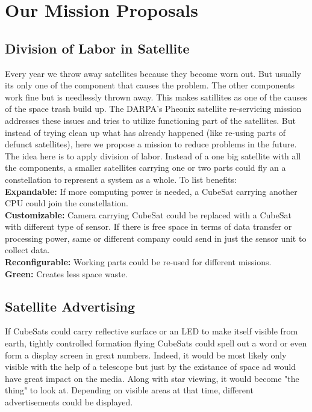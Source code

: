 \section{Our Mission Proposals}

\subsection{Division of Labor in Satellite}
Every year we throw away satellites because they become worn out. But usually its only one of the component that causes the problem. The other components work fine but is needlessly thrown away. This makes satillites as one of the causes of the space trash build up. The DARPA's Pheonix satellite re-servicing mission addresses these issues and tries to utilize functioning part of the satellites. But instead of trying clean up what has already happened (like  re-using parts of defunct satellites), here we propose a mission to reduce problems in the future.
The idea here is to apply division of labor. Instead of a one big satellite with all the components, a smaller satellites carrying one or two parts could fly an a constellation to represent a system as a whole. To list  benefits: \\

{\bf Expandable:} If more computing power is needed, a CubeSat carrying another CPU could join the constellation. \\
 
{\bf Customizable:} Camera carrying CubeSat could be replaced with a CubeSat with different type of sensor.
If there is free space in terms of data transfer or processing power, same or different company could send in just the sensor unit to collect data. \\

{\bf Reconfigurable:} Working parts could be re-used for different missions.\\

{\bf Green:} Creates less space waste.

\subsection{Satellite Advertising}
If CubeSats could carry reflective surface or an LED to make itself visible from earth, tightly controlled formation flying CubeSats could spell out a word or even form a display screen in great numbers. Indeed, it would be most likely only visible with the help of a telescope but just by the existance of space ad would have great impact on the media. Along with star viewing, it would become "the thing" to look at. Depending on visible areas at that time, different advertisements could be displayed.

